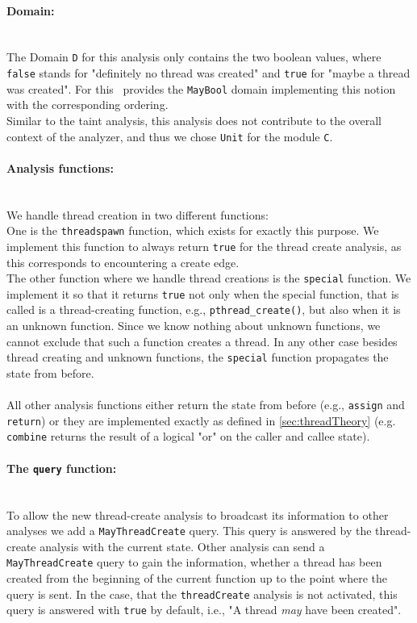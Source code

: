     \paragraph{Domain:}\mbox{}\\
    The Domain \texttt{D} for this analysis only contains the two boolean values, where \texttt{false} stands for "definitely no thread was created" and \texttt{true} for "maybe a thread was created". For this \gob\ provides the \texttt{MayBool} domain implementing this notion with the corresponding ordering.\\
    Similar to the taint analysis, this analysis does not contribute to the overall context of the analyzer, and thus we chose \texttt{Unit} for the module \texttt{C}.

    \paragraph{Analysis functions:}\mbox{}\\ We handle thread creation in two different functions:\\
    One is the \texttt{threadspawn} function, which exists for exactly this purpose. We implement this function to always return \texttt{true} for the thread create analysis, as this corresponds to encountering a create edge.\\
    The other function where we handle thread creations is the \texttt{special} function. We implement it so that it returns \texttt{true} not only when the special function, that is called is a thread-creating function, e.g., \texttt{pthread\_create()}, but also when it is an unknown function. Since we know nothing about unknown functions, we cannot exclude that such a function creates a thread. In any other case besides thread creating and unknown functions, the \texttt{special} function propagates the state from before.\\
    \\
    All other analysis functions either return the state from before (e.g., \texttt{assign} and \texttt{return}) or they are implemented exactly as defined in \autoref{sec:threadTheory} (e.g. \texttt{combine} returns the result of a logical "or" on the caller and callee state).

    \paragraph{The \texttt{query} function:}\mbox{}\\
    To allow the new thread-create analysis to broadcast its information to other analyses we add a \texttt{MayThreadCreate} query. This query is answered by the thread-create analysis with the current state. Other analysis can send a \texttt{MayThreadCreate} query to gain the information, whether a thread has been created from the beginning of the current function up to the point where the query is sent. In the case, that the \texttt{threadCreate} analysis is not activated, this query is answered with \texttt{true} by default, i.e., "A thread \textit{may} have been created".

